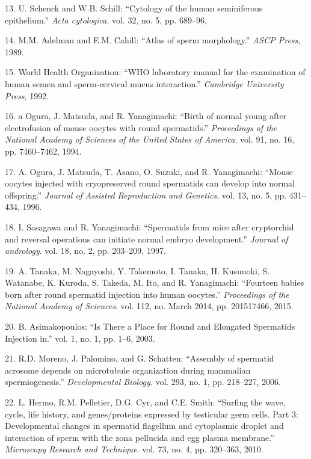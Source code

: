 \documentclass[12pt,twoside]{reedthesis}
\theoremstyle{definition}
\theoremstyle{definition}
\theoremstyle{remark}
\begin{document}
  \hypertarget{ref-Schenck}{}
  13. U. Schenck and W.B. Schill: ``Cytology of the human seminiferous
  epithelium.'' \emph{Acta cytologica}. vol. 32, no. 5, pp. 689--96,
  
  \hypertarget{ref-Adelman1989}{}
  14. M.M. Adelman and E.M. Cahill: ``Atlas of sperm morphology.''
  \emph{ASCP Press}, 1989.
  
  \hypertarget{ref-WorldHealthOrganization1992}{}
  15. World Health Organization: ``WHO laboratory manual for the
  examination of human semen and sperm-cervical mucus interaction.''
  \emph{Cambridge University Press}, 1992.
  
  \hypertarget{ref-Ogura1994}{}
  16. a Ogura, J. Matsuda, and R. Yanagimachi: ``Birth of normal young
  after electrofusion of mouse oocytes with round spermatids.''
  \emph{Proceedings of the National Academy of Sciences of the United
  States of America}. vol. 91, no. 16, pp. 7460--7462, 1994.
  
  \hypertarget{ref-Kimura1995}{}
  17. A. Ogura, J. Matsuda, T. Asano, O. Suzuki, and R. Yanagimachi:
  ``Mouse oocytes injected with cryopreserved round spermatids can develop
  into normal offspring.'' \emph{Journal of Assisted Reproduction and
  Genetics}. vol. 13, no. 5, pp. 431--434, 1996.
  
  \hypertarget{ref-Sasagawa}{}
  18. I. Sasagawa and R. Yanagimachi: ``Spermatids from mice after
  cryptorchid and reversal operations can initiate normal embryo
  development.'' \emph{Journal of andrology}. vol. 18, no. 2, pp.
  203--209, 1997.
  
  \hypertarget{ref-Tanaka2015}{}
  19. A. Tanaka, M. Nagayoshi, Y. Takemoto, I. Tanaka, H. Kusunoki, S.
  Watanabe, K. Kuroda, S. Takeda, M. Ito, and R. Yanagimachi: ``Fourteen
  babies born after round spermatid injection into human oocytes.''
  \emph{Proceedings of the National Academy of Sciences}. vol. 112, no.
  March 2014, pp. 201517466, 2015.
  
  \hypertarget{ref-Asimakopoulos2003}{}
  20. B. Asimakopoulos: ``Is There a Place for Round and Elongated
  Spermatids Injection in.'' vol. 1, no. 1, pp. 1--6, 2003.
  
  \hypertarget{ref-Moreno2006}{}
  21. R.D. Moreno, J. Palomino, and G. Schatten: ``Assembly of spermatid
  acrosome depends on microtubule organization during mammalian
  spermiogenesis.'' \emph{Developmental Biology}. vol. 293, no. 1, pp.
  218--227, 2006.
  
  \hypertarget{ref-Hermo2010}{}
  22. L. Hermo, R.M. Pelletier, D.G. Cyr, and C.E. Smith: ``Surfing the
  wave, cycle, life history, and genes/proteins expressed by testicular
  germ cells. Part 3: Developmental changes in spermatid flagellum and
  cytoplasmic droplet and interaction of sperm with the zona pellucida and
  egg plasma membrane.'' \emph{Microscopy Research and Technique}. vol.
  73, no. 4, pp. 320--363, 2010.
  
\end{document}

